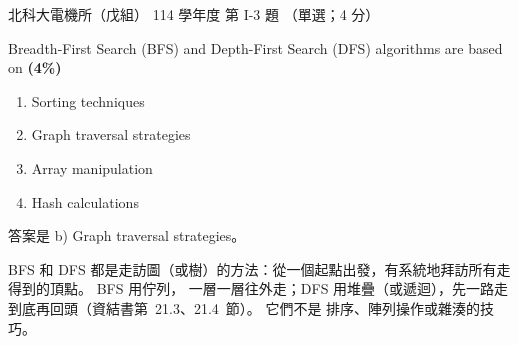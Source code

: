 \begin{pastexam}[label={px:ntut-114-ee-ds-03}]{北科大電機所（戊組） 114 學年度 第 I-3 題}
（單選；4 分）

Breadth-First Search (BFS) and Depth-First Search (DFS) algorithms are based on \textbf{(4\%)}
\begin{enumerate}[label=\alph*)]
\item Sorting techniques
\item Graph traversal strategies
\item Array manipulation
\item Hash calculations
\end{enumerate}
\end{pastexam}

\begin{pastsoln}
答案是 b) Graph traversal strategies。

BFS 和 DFS 都是走訪圖（或樹）的方法：從一個起點出發，有系統地拜訪所有走得到的頂點。 BFS 用佇列，
一層一層往外走；DFS 用堆疊（或遞迴），先一路走到底再回頭（資結書第~21.3、21.4~節）。 它們不是
排序、陣列操作或雜湊的技巧。
\end{pastsoln}
